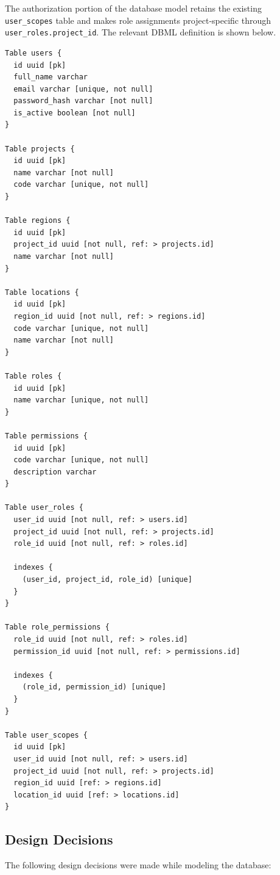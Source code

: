 \documentclass[11pt]{article}
\begin{document}
The authorization portion of the database model retains the existing
\texttt{user\_scopes} table and makes role assignments project-specific through
\texttt{user\_roles.project\_id}. The relevant DBML definition is shown below.

\begin{lstlisting}[basicstyle=\ttfamily\scriptsize]
Table users {
  id uuid [pk]
  full_name varchar
  email varchar [unique, not null]
  password_hash varchar [not null]
  is_active boolean [not null]
}

Table projects {
  id uuid [pk]
  name varchar [not null]
  code varchar [unique, not null]
}

Table regions {
  id uuid [pk]
  project_id uuid [not null, ref: > projects.id]
  name varchar [not null]
}

Table locations {
  id uuid [pk]
  region_id uuid [not null, ref: > regions.id]
  code varchar [unique, not null]
  name varchar [not null]
}

Table roles {
  id uuid [pk]
  name varchar [unique, not null]
}

Table permissions {
  id uuid [pk]
  code varchar [unique, not null]
  description varchar
}

Table user_roles {
  user_id uuid [not null, ref: > users.id]
  project_id uuid [not null, ref: > projects.id]
  role_id uuid [not null, ref: > roles.id]

  indexes {
    (user_id, project_id, role_id) [unique]
  }
}

Table role_permissions {
  role_id uuid [not null, ref: > roles.id]
  permission_id uuid [not null, ref: > permissions.id]

  indexes {
    (role_id, permission_id) [unique]
  }
}

Table user_scopes {
  id uuid [pk]
  user_id uuid [not null, ref: > users.id]
  project_id uuid [not null, ref: > projects.id]
  region_id uuid [ref: > regions.id]
  location_id uuid [ref: > locations.id]
}
\end{lstlisting}

\subsection{Design Decisions}

The following design decisions were made while modeling the database:
\end{document}
